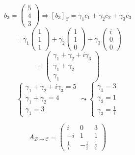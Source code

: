 \documentclass[a4paper]{article}
\theoremstyle{break}
\theoremstyle{break}
\theoremstyle{break}
\theoremstyle{break}
\begin{document}
\begin{enumerate}
	      \vspace{1em}
	      \[
		      b_3 = \begin{pmatrix} 5 \\ 4 \\ 3 \end{pmatrix}
		      \Rightarrow
		      [b_3]_{\mathcal{C}} = \gamma_1 c_1 + \gamma_2 c_2 + \gamma_3 c_3
	      \]
	      \[
		      = \gamma_1 \begin{pmatrix} 1 \\ 1 \\ 1 \end{pmatrix}
		      + \gamma_2 \begin{pmatrix} 1 \\ 1 \\ 0 \end{pmatrix}
		      + \gamma_3 \begin{pmatrix} i \\ 0 \\ 0 \end{pmatrix}
	      \]
	      \[
		      = \begin{pmatrix}
			      \gamma_1 + \gamma_2 + i\gamma_3 \\
			      \gamma_1 + \gamma_2             \\
			      \gamma_1
		      \end{pmatrix}
	      \]
	      \[
		      \begin{cases}
			      \gamma_1 + \gamma_2 + i\gamma_3 = 5 \\
			      \gamma_1 + \gamma_2 = 4             \\
			      \gamma_1 = 3
		      \end{cases}
		      \leadsto
		      \begin{cases}
			      \gamma_1 = 3 \\
			      \gamma_2 = 1 \\
			      \gamma_3 = \frac{1}{i}
		      \end{cases}
	      \]

	      \vspace{1em}
	      \[
		      A_{\mathcal{B} \to \mathcal{C}} = \begin{pmatrix}
			      i           & 0            & 3           \\
			      -i          & 1            & 1           \\
			      \frac{1}{i} & -\frac{1}{i} & \frac{1}{i}
		      \end{pmatrix}
	      \]
\end{enumerate}
\end{document}
